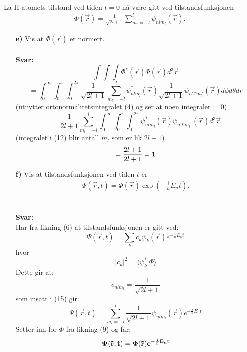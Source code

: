 \documentclass[11pt,a4paper]{report}
\newcounter{excount}[chapter]
\newenvironment{exercise}[1][]{\addtocounter{excount}{1} \noindent {\bf Oppgave
    \arabic{excount} \ \ #1}\hspace{2mm}}{\vspace{4mm}}
\begin{document}
\begin{exercise}[\\]
\begin{itemize}
\end{itemize}

\noindent
\\
La H-atomets tilstand ved tiden $t = 0$ n{\aa} v{\ae}re gitt ved
tilstandsfunksjonen
\begin{eqnarray}
\Phi (\vec{r}) = \frac{1}{\sqrt{2l+1}} \sum_{m_{l} = -l}^{l}
\psi_{n l m_{l}}(\vec{r}).
\label{a}
\end{eqnarray}
\begin{itemize}
\item[\bf e)] Vis at $\Phi (\vec{r})$ er normert.\\
\\
\textbf{Svar:}\\
\begin{equation}
\int\int\int\Phi^{\ast}(\vec{r})\Phi(\vec{r})d^{3}\vec{r}
\end{equation}
\begin{equation}
= \int_{0}^{\infty}\int_{0}^{\pi}\int_{0}^{2\pi}\frac{1}{\sqrt{2l+1}}\sum_{m_{l}=-l}^{l}\psi^{\ast}_{nlm_{l}}(\vec{r})\frac{1}{\sqrt{2l+1}}\psi_{n'l'm_{l}'}(\vec{r})d\phi d\theta dr
\end{equation}
(utnytter ortonormalitetsintegralet (4) og ser at noen integraler = 0)
\begin{equation}
=\frac{1}{2l+1}\sum_{m_{l}=-l}^{l}\int_{0}^{\infty}\int_{0}^{\pi}\int_{0}^{2\pi}\psi^{\ast}_{nlm_{l}}(\vec{r})\psi_{n'l'm_{l}'}(\vec{r})d^{3}\vec{r}
\end{equation}
(integralet i (12) blir antall $m_{l}$ som er lik $2l+1$)
\begin{equation}
=\frac{2l+1}{2l+1} = \bf 1
\end{equation}


\item[\bf f)] Vis at tilstandsfunksjonen ved tiden $t$ er
\begin{eqnarray}
\Psi (\vec{r}, t) = \Phi (\vec{r}) \exp{\left( -\frac{i}{\hbar } E_{n} t \right)}.
\label{b}
\end{eqnarray}\\
\\
\textbf{Svar:}\\
Har fra likning (6) at tilstandsfunksjonen er gitt ved:
\begin{equation}
\Psi(\vec{r},t) = \sum_{k}c_{k}\psi_{k}(\vec{r})e^{-\frac{i}{\hbar}E_{k}t}
\end{equation}
hvor
\begin{equation}
|c_{k}|^{2} = \langle\psi^{\ast}_{k}|\Phi\rangle
\end{equation}
Dette gir at:
\begin{equation}
c_{nlm_{l}}=\frac{1}{\sqrt{2l+1}}
\end{equation}
som insatt i (15) gir:
\begin{equation}
\Psi(\vec{r},t) = \sum_{m_{l}=-l}^{l}\frac{1}{\sqrt{2l+1}}\psi_{nlm_{l}}(\vec{r})e^{-\frac{i}{\hbar}E_{n}t}
\end{equation}
Setter inn for $\Phi$ fra likning (9) og får:
\begin{equation}
\bf\Psi(\vec{r},t) = \Phi(\vec{r})e^{-\frac{i}{\hbar}E_{n}t}
\end{equation}


\end{itemize}
\end{exercise}
\end{document}
